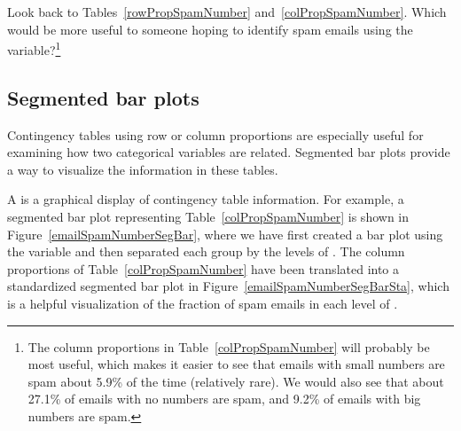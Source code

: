\begin{exercise}
Look back to Tables~\ref{rowPropSpamNumber} and~\ref{colPropSpamNumber}. Which would be more useful to someone hoping to identify spam emails using the  variable?\footnote{The column proportions in Table~\ref{colPropSpamNumber} will probably be most useful, which makes it easier to see that emails with small numbers are spam about 5.9\% of the time (relatively rare). We would also see that about 27.1\% of emails with no numbers are spam, and 9.2\% of emails with big numbers are spam.}
\end{exercise}


\subsection{Segmented bar plots}
\label{segmentedBarPlotsAndIndependence}

Contingency tables using row or column proportions are especially useful for examining how two categorical variables are related. Segmented bar plots provide a way to visualize the information in these tables.

A  is a graphical display of contingency table information. For example, a segmented bar plot representing Table~\ref{colPropSpamNumber} is shown in Figure~\ref{emailSpamNumberSegBar}, where we have first created a bar plot using the  variable and then separated each group by the levels of . The column proportions of Table~\ref{colPropSpamNumber} have been translated into a standardized segmented bar plot in Figure~\ref{emailSpamNumberSegBarSta}, which is a helpful visualization of the fraction of spam emails in each level of .

